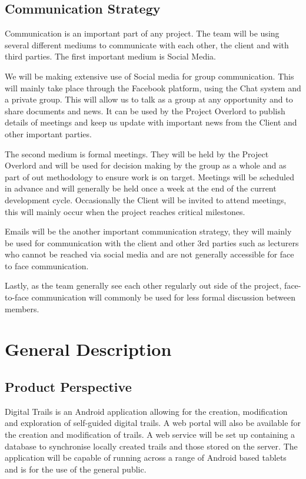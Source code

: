 \documentclass[11pt,a4paper]{article}
\begin{document}
\subsection{Communication Strategy}

Communication is an important part of any project. The team will be using several different mediums to communicate with each other, the client and with third parties. The first important medium is Social Media. 

We will be making extensive use of Social media for group communication. This will mainly take place through the Facebook platform, using the Chat system and a private group. This will allow us to talk as a group at any opportunity and to share documents and news. It can be used by the Project Overlord to publish details of meetings and keep us update with important news from the Client and other important parties. 

The second medium is formal meetings. They will be held by the Project Overlord and will be used for decision making by the group as a whole and as part of out methodology to ensure work is on target. Meetings will be scheduled in advance and will generally be held once a week at the end of the current development cycle. Occasionally the Client will be invited to attend meetings, this will mainly occur when the project reaches critical milestones. 

Emails will be the another important communication strategy, they will mainly be used for communication with the client and other 3rd parties such as lecturers who cannot be reached via social media and are not generally accessible for face to face communication. 

Lastly, as the team generally see each other regularly out side of the project, face-to-face communication will commonly be used for less formal discussion between members. 

\section{General Description}
\label{sec:gen-desc}

\subsection{Product Perspective}
\label{sec:product-perspective}
Digital Trails is an Android application  allowing for the creation, modification and exploration of self-guided digital trails. A web portal will also be available for the creation and modification of trails. A web service will be set up containing a database to synchronise locally created trails and those stored on the server. The application will be capable of running across a range of Android based tablets and is for the use of the general public.
\end{document}
